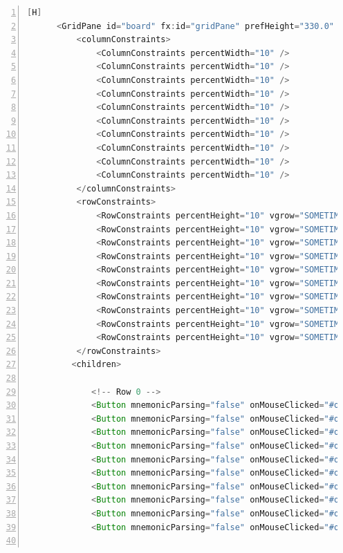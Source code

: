 \documentclass{article}
\begin{document}
\begin{lstlisting}[language=java,caption={Archivo FXML}, numbers=left][H]
      <GridPane id="board" fx:id="gridPane" prefHeight="330.0" prefWidth="352.0">
          <columnConstraints>
              <ColumnConstraints percentWidth="10" />
              <ColumnConstraints percentWidth="10" />
              <ColumnConstraints percentWidth="10" />
              <ColumnConstraints percentWidth="10" />
              <ColumnConstraints percentWidth="10" />
              <ColumnConstraints percentWidth="10" />
              <ColumnConstraints percentWidth="10" />
              <ColumnConstraints percentWidth="10" />
              <ColumnConstraints percentWidth="10" />
              <ColumnConstraints percentWidth="10" />
          </columnConstraints>
          <rowConstraints>
              <RowConstraints percentHeight="10" vgrow="SOMETIMES" />
              <RowConstraints percentHeight="10" vgrow="SOMETIMES" />
              <RowConstraints percentHeight="10" vgrow="SOMETIMES" />
              <RowConstraints percentHeight="10" vgrow="SOMETIMES" />
              <RowConstraints percentHeight="10" vgrow="SOMETIMES" />
              <RowConstraints percentHeight="10" vgrow="SOMETIMES" />
              <RowConstraints percentHeight="10" vgrow="SOMETIMES" />
              <RowConstraints percentHeight="10" vgrow="SOMETIMES" />
              <RowConstraints percentHeight="10" vgrow="SOMETIMES" />
              <RowConstraints percentHeight="10" vgrow="SOMETIMES" />
          </rowConstraints>
         <children>

             <!-- Row 0 -->
             <Button mnemonicParsing="false" onMouseClicked="#onButtonClick" styleClass="button" text="" GridPane.columnIndex="0" GridPane.rowIndex="0" />
             <Button mnemonicParsing="false" onMouseClicked="#onButtonClick" styleClass="button" text="" GridPane.columnIndex="1" GridPane.rowIndex="0" />
             <Button mnemonicParsing="false" onMouseClicked="#onButtonClick" styleClass="button" text="" GridPane.columnIndex="2" GridPane.rowIndex="0" />
             <Button mnemonicParsing="false" onMouseClicked="#onButtonClick" styleClass="button" text="" GridPane.columnIndex="3" GridPane.rowIndex="0" />
             <Button mnemonicParsing="false" onMouseClicked="#onButtonClick" styleClass="button" text="" GridPane.columnIndex="4" GridPane.rowIndex="0" />
             <Button mnemonicParsing="false" onMouseClicked="#onButtonClick" styleClass="button" text="" GridPane.columnIndex="5" GridPane.rowIndex="0" />
             <Button mnemonicParsing="false" onMouseClicked="#onButtonClick" styleClass="button" text="" GridPane.columnIndex="6" GridPane.rowIndex="0" />
             <Button mnemonicParsing="false" onMouseClicked="#onButtonClick" styleClass="button" text="" GridPane.columnIndex="7" GridPane.rowIndex="0" />
             <Button mnemonicParsing="false" onMouseClicked="#onButtonClick" styleClass="button" text="" GridPane.columnIndex="8" GridPane.rowIndex="0" />
             <Button mnemonicParsing="false" onMouseClicked="#onButtonClick" styleClass="button" text="" GridPane.columnIndex="9" GridPane.rowIndex="0" />


\end{lstlisting}
\end{document}
